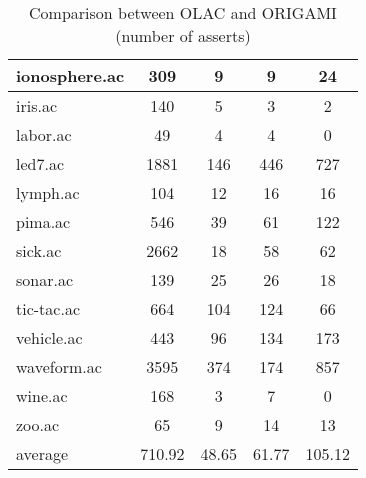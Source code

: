 \begin{table}[htbp]
\begin{tabular}{|l|c|c|c|c|}
		\hline
		ionosphere.ac   & 309           & 9                  & 9                        & 24                            \\
		\hline
		iris.ac         & 140           & 5                  & 3                        & 2                             \\
		\hline
		labor.ac        & 49            & 4                  & 4                        & 0                             \\
		\hline
		led7.ac         & 1881          & 146                & 446                      & 727                           \\
		\hline
		lymph.ac        & 104           & 12                 & 16                       & 16                            \\
		\hline
		pima.ac         & 546           & 39                 & 61                       & 122                           \\
		\hline
		sick.ac         & 2662          & 18                 & 58                       & 62                            \\
		\hline
		sonar.ac        & 139           & 25                 & 26                       & 18                            \\
		\hline
		tic-tac.ac      & 664           & 104                & 124                      & 66                            \\
		\hline
		vehicle.ac      & 443           & 96                 & 134                      & 173                           \\
		\hline
		waveform.ac     & 3595          & 374                & 174                      & 857                           \\
		\hline
		wine.ac         & 168           & 3                  & 7                        & 0                             \\
		\hline
		zoo.ac          & 65            & 9                  & 14                       & 13                            \\
		\hline
		average         & 710.92        & 48.65              & 61.77                    & 105.12                        \\
		\hline
		\end{tabular}
	\caption{Comparison between OLAC and ORIGAMI (number of asserts)}
	\label{tab:comparison_olac_origami}
\end{table}